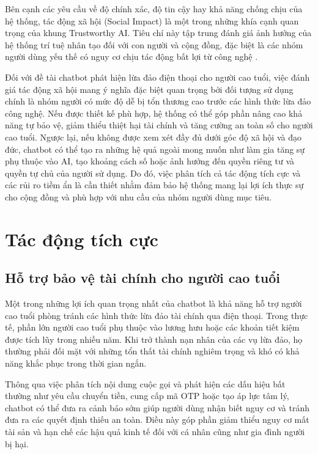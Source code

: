 Bên cạnh các yêu cầu về độ chính xác, độ tin cậy hay khả năng chống chịu của hệ thống, tác động xã hội (Social Impact) là một trong những khía cạnh quan trọng của khung Trustworthy AI. Tiêu chí này tập trung đánh giá ảnh hưởng của hệ thống trí tuệ nhân tạo đối với con người và cộng đồng, đặc biệt là các nhóm người dùng yếu thế có nguy cơ chịu tác động bất lợi từ công nghệ \cite{liu2021_trustworthyai}.

Đối với đề tài chatbot phát hiện lừa đảo điện thoại cho người cao tuổi, việc đánh giá tác động xã hội mang ý nghĩa đặc biệt quan trọng bởi đối tượng sử dụng chính là nhóm người có mức độ dễ bị tổn thương cao trước các hình thức lừa đảo công nghệ. Nếu được thiết kế phù hợp, hệ thống có thể góp phần nâng cao khả năng tự bảo vệ, giảm thiểu thiệt hại tài chính và tăng cường an toàn số cho người cao tuổi. Ngược lại, nếu không được xem xét đầy đủ dưới góc độ xã hội và đạo đức, chatbot có thể tạo ra những hệ quả ngoài mong muốn như làm gia tăng sự phụ thuộc vào AI, tạo khoảng cách số hoặc ảnh hưởng đến quyền riêng tư và quyền tự chủ của người sử dụng.
Do đó, việc phân tích cả tác động tích cực và các rủi ro tiềm ẩn là cần thiết nhằm đảm bảo hệ thống mang lại lợi ích thực sự cho cộng đồng và phù hợp với nhu cầu của nhóm người dùng mục tiêu.

\section{Tác động tích cực}
\subsection{Hỗ trợ bảo vệ tài chính cho người cao tuổi}
Một trong những lợi ích quan trọng nhất của chatbot là khả năng hỗ trợ người cao tuổi phòng tránh các hình thức lừa đảo tài chính qua điện thoại. Trong thực tế, phần lớn người cao tuổi phụ thuộc vào lương hưu hoặc các khoản tiết kiệm được tích lũy trong nhiều năm. Khi trở thành nạn nhân của các vụ lừa đảo, họ thường phải đối mặt với những tổn thất tài chính nghiêm trọng và khó có khả năng khắc phục trong thời gian ngắn.

Thông qua việc phân tích nội dung cuộc gọi và phát hiện các dấu hiệu bất thường như yêu cầu chuyển tiền, cung cấp mã OTP hoặc tạo áp lực tâm lý, chatbot có thể đưa ra cảnh báo sớm giúp người dùng nhận biết nguy cơ và tránh đưa ra các quyết định thiếu an toàn. Điều này góp phần giảm thiểu nguy cơ mất tài sản và hạn chế các hậu quả kinh tế đối với cá nhân cũng như gia đình người bị hại.

